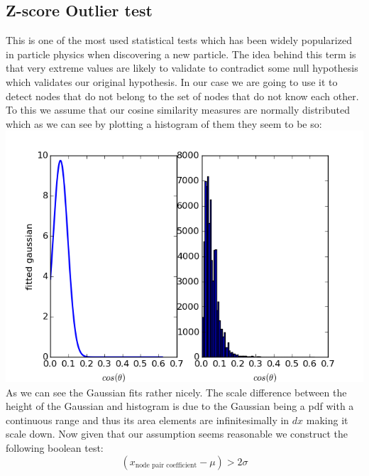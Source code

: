 \documentclass[10pt,twocolumn]{article}
\begin{document}
\subsection{Z-score Outlier test}
This is one of the most used statistical tests which has been widely popularized in particle physics when discovering a new particle. The idea behind this term is that very extreme values are likely to validate to contradict some null hypothesis which validates our original hypothesis. In our case we are going to use it to detect nodes that do not belong to the set of nodes that do not know each other.
\newline
To this we assume that our cosine similarity measures are normally distributed which as we can see by plotting a histogram of them they seem to be so:
\includegraphics[scale=0.422]{pics/hist2.png}
As we can see the Gaussian fits rather nicely. The scale difference between the height of the Gaussian and histogram is due to the Gaussian being a pdf with a continuous range and thus its area elements are infinitesimally in $dx$ making it scale down.
\newline
Now given that our assumption seems reasonable we construct the following boolean test:
\[
(x_{\text{node pair coefficient}} - \mu) > 2\sigma
\]
\end{document}
